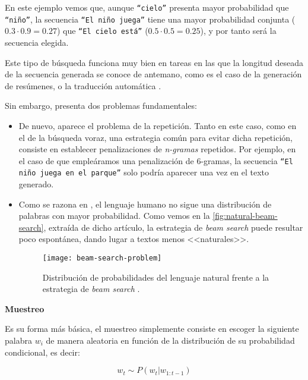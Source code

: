 En este ejemplo vemos que, aunque \texttt{``cielo''} presenta mayor probabilidad que \texttt{``niño''}, la secuencia \texttt{``El niño juega''} tiene una mayor probabilidad conjunta ($0.3 \cdot 0.9 = 0.27$) que \texttt{``El cielo está''} ($0.5 \cdot 0.5  = 0.25$), y por tanto será la secuencia elegida.

Este tipo de búsqueda funciona muy bien en tareas en las que la longitud deseada de la secuencia generada se conoce de antemano, como es el caso de la generación de resúmenes, o la traducción automática \cite{murray18, yang18}.

Sin embargo, presenta dos problemas fundamentales:

\vspace*{-\baselineskip}
\begin{itemize}
	\item [\textbullet] De nuevo, aparece el problema de la repetición. Tanto en este caso, como en el de la búsqueda voraz, una estrategia común para evitar dicha repetición, consiste en establecer penalizaciones de \emph{n-gramas} repetidos. Por ejemplo, en el caso de que empleáramos una penalización de 6-gramas, la secuencia \texttt{``El niño juega en el parque''} solo podría aparecer una vez en el texto generado.

	\item [\textbullet] Como se razona en \cite{holtzman20}, el lenguaje humano no sigue una distribución de palabras con mayor probabilidad. Como vemos en la \autoref{fig:natural-beam-search}, extraída de dicho artículo, la estrategia de \emph{beam search} puede resultar poco espontánea, dando lugar a textos menos <<naturales>>.
	
	\begin{figure}[!h]
		\centering
		\texttt{[image: beam-search-problem]}
		\caption[Distribución de probabilidades en la generación.]{Distribución de probabilidades del lenguaje natural frente a la estrategia de \emph{beam search} \cite{holtzman20}.}
		\label{fig:natural-beam-search}
	\end{figure}
\end{itemize}


\bigskip
\noindent
\textbf{Muestreo}

Es su forma más básica, el muestreo simplemente consiste en escoger la siguiente palabra $w_i$ de manera aleatoria en función de la distribución de su probabilidad condicional, es decir:

\[ w_t \sim P(w_t | w_{1:t-1}) \]

